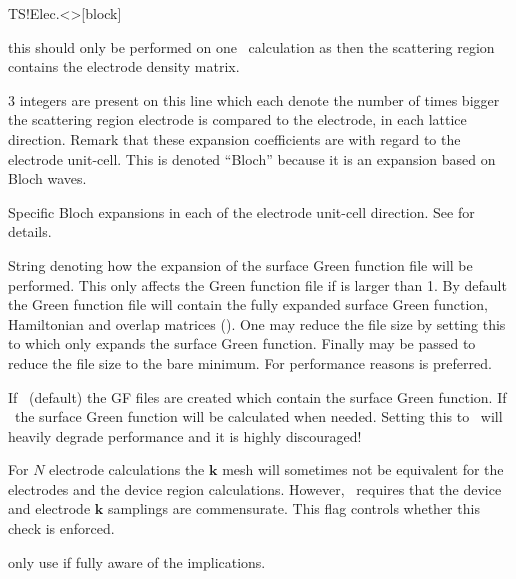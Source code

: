 \begin{fdfentry}{TS!Elec.<>}[block]
\begin{fdfoptions}
    \note this should only be performed on one \tsiesta\ calculation
    as then the scattering region  contains the
    electrode density matrix.

    \option[Bloch]%
    $3$ integers are present on this line which each denote the number
    of times bigger the scattering region electrode is compared to the
    electrode, in each lattice direction. Remark that these expansion
    coefficients are with regard to the electrode unit-cell.
    This is denoted ``Bloch'' because it is an expansion based on
    Bloch waves.

    \option[Bloch-A/a1|B/a2|C/a3]%
    Specific Bloch expansions in each of the electrode unit-cell
    direction. See  for details.

    String denoting how the expansion of the surface Green function
    file will be performed. This only affects the Green function file
    if  is larger than 1. By default the Green function
    file will contain the fully expanded surface Green function,
    Hamiltonian and overlap matrices (). One may reduce the
    file size by setting this to  which only expands the
    surface Green function. Finally  may be passed to
    reduce the file size to the bare minimum. 
    For performance reasons  is preferred. 

    If \fdftrue\ (default) the GF files are created which contain
    the surface Green function.
    If \fdffalse\ the surface Green function will be calculated when
    needed. 
    Setting this to \fdffalse\ will heavily degrade performance and
    it is highly discouraged!

    For $N$ electrode calculations the $\mathbf k$ mesh will sometimes
    not be equivalent for the electrodes and the device region
    calculations. However, \tsiesta\ requires that the device and
    electrode $\mathbf k$ samplings are commensurate. This flag
    controls whether this check is enforced.

    \note only use if fully aware of the implications.

  \end{fdfoptions}
  
\end{fdfentry}

